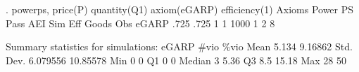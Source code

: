 . powerps, price(P) quantity(Q1) axiom(eGARP) efficiency(1)
{\smallskip}
      Axioms {\VBAR}     Power         PS       Pass        AEI        Sim        Eff      Goods        Obs 
       eGARP {\VBAR}      .725       .725          1          1       1000          1          2          8 
 
Summary statistics for simulations:
{\smallskip}
       eGARP {\VBAR}      \#vio       \%vio 
        Mean {\VBAR}     5.134    9.16862 
   Std. Dev. {\VBAR}  6.079556   10.85578 
         Min {\VBAR}         0          0 
          Q1 {\VBAR}         0          0 
      Median {\VBAR}         3       5.36 
          Q3 {\VBAR}       8.5      15.18 
         Max {\VBAR}        28         50 
{\smallskip}
{\smallskip}